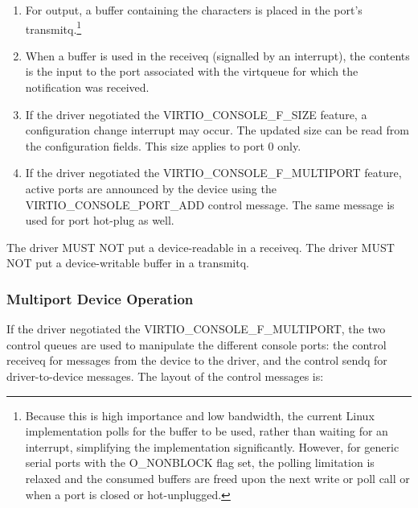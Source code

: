 \begin{enumerate}
\item For output, a buffer containing the characters is placed in
  the port's transmitq.\footnote{Because this is high importance and low bandwidth, the current
Linux implementation polls for the buffer to be used, rather than
waiting for an interrupt, simplifying the implementation
significantly. However, for generic serial ports with the
O_NONBLOCK flag set, the polling limitation is relaxed and the
consumed buffers are freed upon the next write or poll call or
when a port is closed or hot-unplugged.
}

\item When a buffer is used in the receiveq (signalled by an
  interrupt), the contents is the input to the port associated
  with the virtqueue for which the notification was received.

\item If the driver negotiated the VIRTIO_CONSOLE_F_SIZE feature, a
  configuration change interrupt may occur. The updated size can
  be read from the configuration fields.  This size applies to port 0 only.

\item If the driver negotiated the VIRTIO_CONSOLE_F_MULTIPORT
  feature, active ports are announced by the device using the
  VIRTIO_CONSOLE_PORT_ADD control message. The same message is
  used for port hot-plug as well.
\end{enumerate}


The driver MUST NOT put a device-readable in a receiveq. The driver
MUST NOT put a device-writable buffer in a transmitq.

\subsubsection{Multiport Device Operation}\label{sec:Device Types / Console Device / Device Operation / Multiport Device Operation}

If the driver negotiated the VIRTIO_CONSOLE_F_MULTIPORT, the two
control queues are used to manipulate the different console ports: the
control receiveq for messages from the device to the driver, and the
control sendq for driver-to-device messages.  The layout of the
control messages is:

